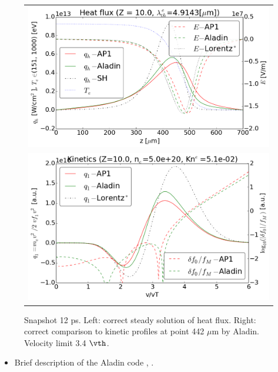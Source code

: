 \begin{figure}[tbh]
  \begin{center}
    \begin{tabular}{c}
      \includegraphics[width=\figscale\textwidth]{../VFPdata/C7_Aladin_case3_heatflux.png} \\
      \includegraphics[width=\figscale\textwidth]{../VFPdata/C7_Aladin_case3_kinetics.png}
    \end{tabular}
  \caption{  
  Snapshot 12 ps. Left: correct steady solution of heat flux. 
  Right: correct comparison to kinetic profiles at point 442 $\mu$m by Aladin. 
  Velocity limit 3.4 $\vth$.
  }
  \label{fig:C7_Aladin_case3}
  \end{center} 
\end{figure}

\begin{itemize}
  \item Brief description of the Aladin code , . %
\end{itemize}

